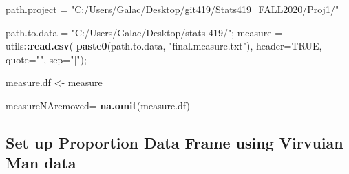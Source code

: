 \documentclass[]{article}
\newenvironment{Shaded}{\begin{snugshade}}{\end{snugshade}}
\newcommand{\DataTypeTok}[1]{\textcolor[rgb]{0.13,0.29,0.53}{#1}}
\newcommand{\KeywordTok}[1]{\textcolor[rgb]{0.13,0.29,0.53}{\textbf{#1}}}
\newcommand{\NormalTok}[1]{#1}
\newcommand{\OperatorTok}[1]{\textcolor[rgb]{0.81,0.36,0.00}{\textbf{#1}}}
\newcommand{\OtherTok}[1]{\textcolor[rgb]{0.56,0.35,0.01}{#1}}
\newcommand{\StringTok}[1]{\textcolor[rgb]{0.31,0.60,0.02}{#1}}
\begin{document}
\begin{Shaded}
\begin{Highlighting}[]
\NormalTok{path.project =}\StringTok{ "C:/Users/Galac/Desktop/git419/Stats419\_FALL2020/Proj1/"}

\NormalTok{path.to.data =}\StringTok{ "C:/Users/Galac/Desktop/stats 419/"}\NormalTok{;}
\NormalTok{measure =}\StringTok{ }\NormalTok{utils}\OperatorTok{::}\KeywordTok{read.csv}\NormalTok{( }\KeywordTok{paste0}\NormalTok{(path.to.data, }\StringTok{"final.measure.txt"}\NormalTok{), }\DataTypeTok{header=}\OtherTok{TRUE}\NormalTok{, }\DataTypeTok{quote=}\StringTok{""}\NormalTok{, }\DataTypeTok{sep=}\StringTok{"|"}\NormalTok{);}

\NormalTok{measure.df \textless{}{-}}\StringTok{ }\NormalTok{measure}

\NormalTok{measureNAremoved=}\StringTok{ }\KeywordTok{na.omit}\NormalTok{(measure.df)}
\end{Highlighting}
\end{Shaded}

\subsection{Set up Proportion Data Frame using Virvuian Man data}
\end{document}
